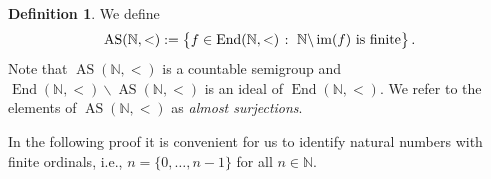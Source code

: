 \documentclass[11pt]{amsart}
\makeatletter
\theoremstyle{definition}
\newtheorem{definition}[theorem]{Definition}
\newcommand{\N}{\mathbb N}
\newcommand{\im}{\operatorname{im}}
\newcommand{\makeset}[2]{\left\lbrace #1 \; \colon\;
 \begin{tabular}{@{}l@{}}
   #2
  \end{tabular}
  \right\rbrace}
\makeatother
\begin{document}

\begin{definition}
 We define 
 \[\operatorname{AS}(\N,<):=\makeset{f\in \operatorname{End}(\N, <)}{\(\N\backslash \im(f)\) is finite}. \]
 Note that \(\operatorname{AS}(\N,<)\) is a countable semigroup and \(\operatorname{End}(\N, <)\backslash \operatorname{AS}(\N,<)\) is an ideal of \(\operatorname{End}(\N, <)\).
 We refer to the elements of \(\operatorname{AS}(\N,<)\) as \emph{almost surjections}.
\end{definition}

In the following proof it is convenient for us to identify natural numbers with finite ordinals, i.e., $n=\{0,\ldots, n-1\}$ for all $n\in\N$.
\end{document}
